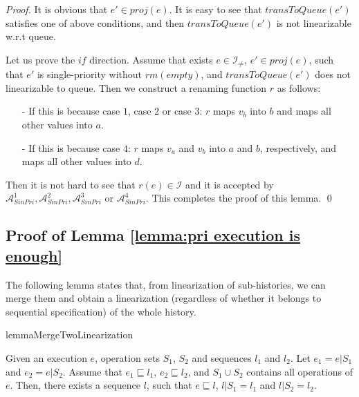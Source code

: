 \begin {proof}
It is obvious that $e' \in \textit{proj}(e)$. It is easy to see that $\textit{transToQueue}(e')$ satisfies one of above conditions, and then $\textit{transToQueue}(e')$ is not linearizable w.r.t queue.

Let us prove the $\textit{if}$ direction. Assume that exists $e \in \mathcal{I}_{\neq}$, $e' \in \textit{proj}(e)$, such that $e'$ is single-priority  without $\textit{rm}(\textit{empty})$, and $\textit{transToQueue}(e')$ does not linearizable to queue. Then we construct a renaming function $r$ as follows:

\begin{itemize}
\setlength{\itemsep}{0.5pt}
\item[-] If this is because case $1$, case $2$ or case $3$: $r$ maps $v_b$ into $b$ and maps all other values into $a$.

\item[-] If this is because case $4$: $r$ maps $v_a$ and $v_b$ into $a$ and $b$, respectively, and maps all other values into $d$.
\end{itemize}

Then it is not hard to see that $r(e) \in \mathcal{I}$ and it is accepted by $\mathcal{A}_{\textit{SinPri}}^1, \mathcal{A}_{\textit{SinPri}}^2, \mathcal{A}_{\textit{SinPri}}^3$ or $\mathcal{A}_{\textit{SinPri}}^4$. This completes the proof of this lemma. \qed
\end {proof}




\subsection{Proof of Lemma \ref{lemma:pri execution is enough}}
\label{sec:appendix proof of Lemma pri execution is enough}

The following lemma states that, from linearization of sub-histories, we can merge them and obtain a linearization (regardless of whether it belongs to sequential specification) of the whole history.

\begin{restatable}{lemma}{MergeTwoLinearization}
\label{lemma:merge two linearization}

Given an execution $e$, operation sets $S_1$, $S_2$ and sequences $l_1$ and $l_2$. Let $e_1 = e \vert{S_1}$ and $e_2 = e \vert{S_2}$. Assume that $e_1 \sqsubseteq l_1$, $e_2 \sqsubseteq l_2$, and $S_1 \cup S_2$ contains all operations of $e$. Then, there exists a sequence $l$, such that $e \sqsubseteq l$, $l \vert{S_1} = l_1$ and $l \vert{S_2} = l_2$.
\end{restatable}

